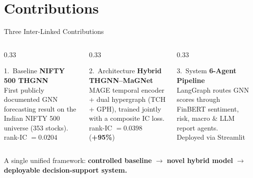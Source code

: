 \documentclass[aspectratio=169, 10pt]{beamer}
\newcommand{\best}[1]{\textcolor{primary}{\textbf{#1}}}
\begin{document}
\section{Contributions}

\begin{frame}{Three Inter-Linked Contributions}
  \begin{columns}[T]
    \begin{column}{0.33\textwidth}
      \begin{block}{1.\ Baseline}
        \textbf{NIFTY 500 THGNN}\\[4pt]
        First publicly documented GNN forecasting result on the
        Indian NIFTY 500 universe (353 stocks).\\[4pt]
        rank-IC $=0.0204$
      \end{block}
    \end{column}
    \begin{column}{0.33\textwidth}
      \begin{block}{2.\ Architecture}
        \textbf{Hybrid THGNN--MaGNet}\\[4pt]
        MAGE temporal encoder + \alert{dual hypergraph} (TCH + GPH),
        trained jointly with a composite IC loss.\\[4pt]
        rank-IC $=0.0398$ \;(\best{+95\%})
      \end{block}
    \end{column}
    \begin{column}{0.33\textwidth}
      \begin{block}{3.\ System}
        \textbf{6-Agent Pipeline}\\[4pt]
        LangGraph routes GNN scores through FinBERT sentiment, risk,
        macro \& LLM report agents.\\[4pt]
        Deployed via Streamlit
      \end{block}
    \end{column}
  \end{columns}

  \vspace{0.5cm}
  \centering
  \footnotesize
  A single unified framework: \textbf{controlled baseline} $\rightarrow$
  \textbf{novel hybrid model} $\rightarrow$ \textbf{deployable decision-support system.}
\end{frame}

\end{document}
